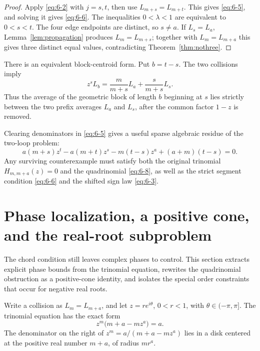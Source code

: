 \documentclass[11pt]{article}
\numberwithin{equation}{section}
\theoremstyle{definition}
\begin{document}
\begin{proof}
Apply \eqref{eq:6-2} with \(j=s,t\), then use
\(L_{m+s}=L_{m+t}\).  This gives \eqref{eq:6-5}, and solving it gives
\eqref{eq:6-6}.  The inequalities \(0<\lambda<1\) are equivalent to \(0<s<t\).
The four edge endpoints are distinct, so \(s\neq a\).  If
\(L_s=L_a\), Lemma~\ref{lem:propagation} produces
\(L_m=L_{m+s}\); together with \(L_m=L_{m+a}\) this gives three
distinct equal values, contradicting Theorem~\ref{thm:nothree}.
\end{proof}

There is an equivalent block-centroid form.  Put \(b=t-s\).  The two
collisions imply
\begin{equation}
 z^sL_b
 =\frac{m}{m+s}L_a+\frac{s}{m+s}L_s.
 \label{eq:6-7}
\end{equation}
Thus the average of the geometric block of length \(b\) beginning at \(s\)
lies strictly between the two prefix averages \(L_a\) and \(L_s\), after the
common factor \(1-z\) is removed.

Clearing denominators in \eqref{eq:6-5} gives a useful sparse algebraic residue of
the two-loop problem:
\begin{equation}
 a(m+s)z^t-a(m+t)z^s-m(t-s)z^a+(a+m)(t-s)=0.
 \label{eq:6-8}
\end{equation}
Any surviving counterexample must satisfy both the original trinomial
\(H_{m,m+a}(z)=0\) and the quadrinomial \eqref{eq:6-8}, as well as the strict
segment condition \eqref{eq:6-6} and the shifted sign law \eqref{eq:6-3}.

\section{Phase localization, a positive cone, and the real-root subproblem}
\label{sec:phase}

The chord condition still leaves complex phases to control.  This section extracts explicit phase bounds from the trinomial equation, rewrites the quadrinomial obstruction as a positive-cone identity, and isolates the special order constraints that occur for negative real roots.

Write a collision as \(L_m=L_{m+a}\), and let
\(z=re^{i\theta}\), \(0<r<1\), with \(\theta\in(-\pi,\pi]\).
The trinomial equation has the exact form
\begin{equation}
 z^m\bigl(m+a-mz^a\bigr)=a.
 \label{eq:7-1}
\end{equation}
The denominator on the right of
\(z^m=a/(m+a-mz^a)\) lies in a disk centered at the positive real number
\(m+a\), of radius \(mr^a\).
\end{document}
